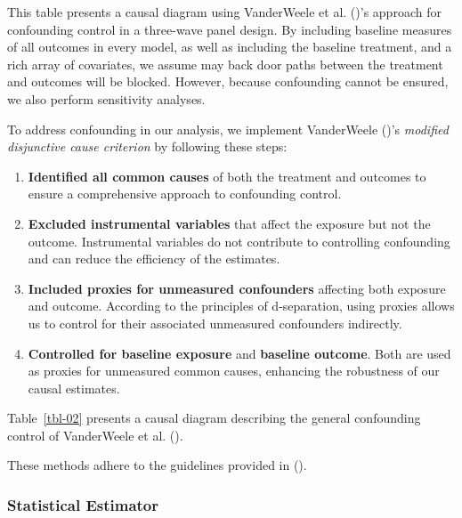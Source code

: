 \documentclass[
  single column]{article}
\providecommand{\tightlist}{%
  \setlength{\itemsep}{0pt}\setlength{\parskip}{0pt}}\usepackage{longtable,booktabs,array}
\begin{document}
\begin{table}

\caption{\label{tbl-02}This table presents a causal diagram using
VanderWeele et al. ()'s approach for
confounding control in a three-wave panel design. By including baseline
measures of all outcomes in every model, as well as including the
baseline treatment, and a rich array of covariates, we assume may back
door paths between the treatment and outcomes will be blocked. However,
because confounding cannot be ensured, we also perform sensitivity
analyses.}

\centering{

\threevanderweeele

}

\end{table}%

To address confounding in our analysis, we implement VanderWeele
()'s \emph{modified disjunctive
cause criterion} by following these steps:

\begin{enumerate}
\def\labelenumi{\arabic{enumi}.}
\tightlist
\item
  \textbf{Identified all common causes} of both the treatment and
  outcomes to ensure a comprehensive approach to confounding control.
\item
  \textbf{Excluded instrumental variables} that affect the exposure but
  not the outcome. Instrumental variables do not contribute to
  controlling confounding and can reduce the efficiency of the
  estimates.
\item
  \textbf{Included proxies for unmeasured confounders} affecting both
  exposure and outcome. According to the principles of d-separation,
  using proxies allows us to control for their associated unmeasured
  confounders indirectly.
\item
  \textbf{Controlled for baseline exposure} and \textbf{baseline
  outcome}. Both are used as proxies for unmeasured common causes,
  enhancing the robustness of our causal estimates.
\end{enumerate}

Table~\ref{tbl-02} presents a causal diagram describing the general
confounding control of VanderWeele et al.
().

These methods adhere to the guidelines provided in
().

\subsubsection{Statistical Estimator}\label{statistical-estimator}
\end{document}

